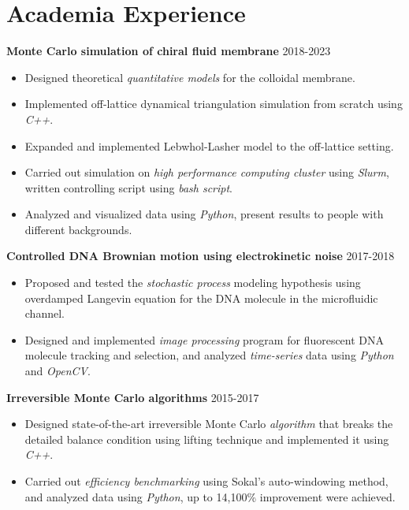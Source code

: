 \documentclass[11pt,letterpaper]{article}
\begin{document}
\vspace*{-0.05in}

\section*{Academia Experience}
\vspace*{-0.1in}
\begin{comment}
\textbf{Computational fluid dynamics (CFD) simulation of artificial swimmers} \hfill 2021-2022
\vspace*{-0.05in}
\begin{itemize}
    \item Designed swimmer model using \emph{Blender}.
    \item Implemented \emph{OpenFoam} case for the swimmer model using dynamical mesh.
    \item Carried out CFD simulation and worked closely with experimentalist.
\end{itemize}
\end{comment}
\textbf{Monte Carlo simulation of chiral fluid membrane} \hfill 2018-2023
\vspace*{-0.05in}
\begin{itemize}
    \item Designed theoretical \emph{quantitative models} for the colloidal membrane.
    \item Implemented off-lattice dynamical triangulation simulation from scratch using \emph{C++}.
    \item Expanded and implemented Lebwhol-Lasher model to the off-lattice setting.
    \item Carried out simulation on \emph{high performance computing cluster} using \emph{Slurm}, written controlling script using \emph{bash script}.
    \item Analyzed and visualized data using \emph{Python}, present results to people with different backgrounds.
\end{itemize}
\textbf{Controlled DNA Brownian motion using electrokinetic noise} \hfill 2017-2018
\vspace*{-0.05in}
\begin{itemize}
    \item Proposed and tested the \emph{stochastic process} modeling hypothesis using overdamped Langevin equation for the DNA molecule in the microfluidic channel.
    \item Designed and implemented \emph{image processing} program for fluorescent DNA molecule tracking and selection, and analyzed \emph{time-series} data using \emph{Python} and \emph{OpenCV}.
\end{itemize}
\textbf{Irreversible Monte Carlo algorithms} \hfill 2015-2017
\vspace*{-0.05in}
\begin{itemize}
    \item Designed state-of-the-art irreversible Monte Carlo \emph{algorithm} that breaks the detailed balance condition using lifting technique and implemented it using \emph{C++}.
    \item Carried out \emph{efficiency benchmarking} using Sokal's auto-windowing method, and analyzed data using \emph{Python}, up to 14,100\% improvement were achieved.
\end{itemize}
\end{document}
